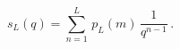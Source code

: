 \documentclass[12pt]{article}
\begin{document}
\begin{displaymath}
s _ { L } ( q ) = \sum _ { n = 1 } ^ { L } \, p _ { L } ( m ) \, \frac { 1 } { q ^ { n - 1 } } \, .
\end{displaymath}
\end{document}

